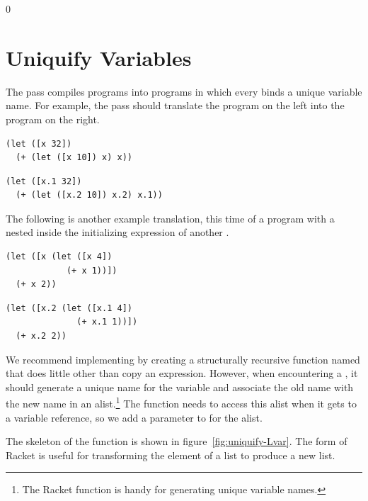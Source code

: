 \documentclass[7x10]{TimesAPriori_MIT}%
\def\racketEd{0}
\def\edition{0}
\numberwithin{theorem}{chapter}
\numberwithin{definition}{chapter}
\numberwithin{equation}{chapter}
\begin{document}
{\if\edition\racketEd  
\section{Uniquify Variables}
\label{sec:uniquify-Lvar}

The  pass compiles \LangVar{} programs into \LangVar{}
programs in which every  binds a unique variable name. For
example, the  pass should translate the program on the
left into the program on the right. 
\begin{transformation}
\begin{lstlisting}
(let ([x 32])
  (+ (let ([x 10]) x) x))
\end{lstlisting}
\compilesto
\begin{lstlisting}
(let ([x.1 32])
  (+ (let ([x.2 10]) x.2) x.1))
\end{lstlisting}
\end{transformation}
The following is another example translation, this time of a program
with a  nested inside the initializing expression of another
.
\begin{transformation}
\begin{lstlisting}
(let ([x (let ([x 4])
            (+ x 1))])
  (+ x 2))
\end{lstlisting}
\compilesto
\begin{lstlisting}
(let ([x.2 (let ([x.1 4])
              (+ x.1 1))])
  (+ x.2 2))
\end{lstlisting}
\end{transformation}

We recommend implementing  by creating a structurally
recursive function named  that does little other
than copy an expression. However, when encountering a , it
should generate a unique name for the variable and associate the old
name with the new name in an alist.\footnote{The Racket function
   is handy for generating unique variable names.} The
 function needs to access this alist when it gets
to a variable reference, so we add a parameter to 
for the alist.

The skeleton of the  function is shown in
figure~\ref{fig:uniquify-Lvar}.
The
%
\href{https://docs.racket-lang.org/reference/for.html#%28form._%28%28lib._racket%2Fprivate%2Fbase..rkt%29._for%2Flist%29%29}{\key{for/list}}
%
form of Racket is useful for transforming the element of a list to
produce a new list.

}
\end{document}
